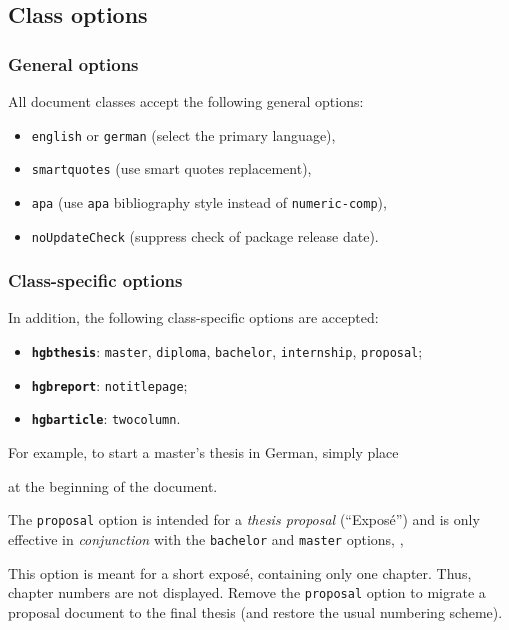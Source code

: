 \documentclass[english]{hgbarticle}
\begin{document}
\subsection{Class options}

\subsubsection{General options}

All document classes accept the following general options:
%
\begin{itemize}
    \item \texttt{english} or \texttt{german} (select the primary language),
    \item \texttt{smartquotes} (use smart quotes replacement),
    \item \texttt{apa} (use \texttt{apa} bibliography style instead of
    \texttt{numeric-comp}),
    \item \texttt{noUpdateCheck} (suppress check of package release date).
\end{itemize}


\subsubsection{Class-specific options}

In addition, the following class-specific options are accepted:
%
\begin{itemize}
    \item \textbf{\texttt{hgbthesis}}:
    \texttt{master}, \texttt{diploma}, \texttt{bachelor}, \texttt{internship}, \texttt{proposal};
    \item \textbf{\texttt{hgbreport}}: \texttt{notitlepage};
    \item \textbf{\texttt{hgbarticle}}: \texttt{twocolumn}.
\end{itemize}
%
For example, to start a master's thesis in German, simply place
%
%
at the beginning of the document.

The \texttt{proposal} option is intended for a \emph{thesis proposal} (``Exposé'') and is 
only effective in \emph{conjunction} with the \texttt{bachelor} and \texttt{master} 
options, \eg,
%
%
This option is meant for a short exposé, containing only one chapter. Thus,
chapter numbers are not displayed. Remove the \texttt{proposal} option to
migrate a proposal document to the final thesis (and restore the usual
numbering scheme).
\end{document}
